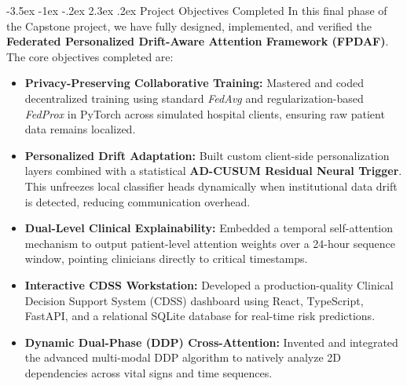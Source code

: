 \documentclass[11pt, a4paper]{article}
\makeatletter
\renewcommand\section{\@startsection {section}{1}{\z@}%
                                   {-3.5ex \@plus -1ex \@minus -.2ex}%
                                   {2.3ex \@plus.2ex}%
                                   {\normalfont\large\bfseries\color{amritaMaroon}}}
\makeatother
\begin{document}
\vspace{0.3cm}


\section{Project Objectives Completed}
In this final phase of the Capstone project, we have fully designed, implemented, and verified the \textbf{Federated Personalized Drift-Aware Attention Framework (FPDAF)}. The core objectives completed are:
\begin{itemize}
    \item \textbf{Privacy-Preserving Collaborative Training:} Mastered and coded decentralized training using standard \textit{FedAvg} and regularization-based \textit{FedProx} in PyTorch across simulated hospital clients, ensuring raw patient data remains localized.
    \item \textbf{Personalized Drift Adaptation:} Built custom client-side personalization layers combined with a statistical \textbf{AD-CUSUM Residual Neural Trigger}. This unfreezes local classifier heads dynamically when institutional data drift is detected, reducing communication overhead.
    \item \textbf{Dual-Level Clinical Explainability:} Embedded a temporal self-attention mechanism to output patient-level attention weights over a 24-hour sequence window, pointing clinicians directly to critical timestamps.
    \item \textbf{Interactive CDSS Workstation:} Developed a production-quality Clinical Decision Support System (CDSS) dashboard using React, TypeScript, FastAPI, and a relational SQLite database for real-time risk predictions.
    \item \textbf{Dynamic Dual-Phase (DDP) Cross-Attention:} Invented and integrated the advanced multi-modal DDP algorithm to natively analyze 2D dependencies across vital signs and time sequences.
\end{itemize}
\end{document}
